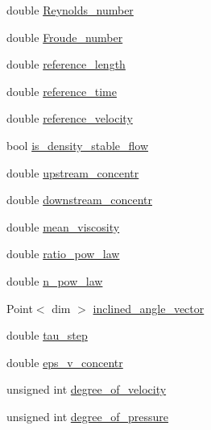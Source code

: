 \begin{DoxyCompactItemize}
\item 
double \hyperlink{struct_u_b_c__mis__mixing_1_1_parameters_aee9ec05b6197d2bb35ac20df039700ff}{Reynolds\+\_\+number}
\item 
double \hyperlink{struct_u_b_c__mis__mixing_1_1_parameters_a83dc42fae26cde2af3c525e1eedc2f2a}{Froude\+\_\+number}
\item 
double \hyperlink{struct_u_b_c__mis__mixing_1_1_parameters_a8e98aacf8865ea49090c7e1ab2e460f5}{reference\+\_\+length}
\item 
double \hyperlink{struct_u_b_c__mis__mixing_1_1_parameters_abd08d52e96063537e6f97c7d3e50e830}{reference\+\_\+time}
\item 
double \hyperlink{struct_u_b_c__mis__mixing_1_1_parameters_a77b36610cc1cd6f5a07dc362c490d14d}{reference\+\_\+velocity}
\item 
bool \hyperlink{struct_u_b_c__mis__mixing_1_1_parameters_afbdbb5e1c2b5eab71b32ba865d33222c}{is\+\_\+density\+\_\+stable\+\_\+flow}
\item 
double \hyperlink{struct_u_b_c__mis__mixing_1_1_parameters_a70038d4135c91df2f4e5bc264436c537}{upstream\+\_\+concentr}
\item 
double \hyperlink{struct_u_b_c__mis__mixing_1_1_parameters_a398a5206459752d26d9851834bb8ef43}{downstream\+\_\+concentr}
\item 
double \hyperlink{struct_u_b_c__mis__mixing_1_1_parameters_acc367af009234bfb0e3c6af0d3872ce2}{mean\+\_\+viscosity}
\item 
double \hyperlink{struct_u_b_c__mis__mixing_1_1_parameters_a3fd3d1dc26004ad858cd04ed0fa80867}{ratio\+\_\+pow\+\_\+law}
\item 
double \hyperlink{struct_u_b_c__mis__mixing_1_1_parameters_a897cb7915129443818689eba5432f95e}{n\+\_\+pow\+\_\+law}
\item 
Point$<$ dim $>$ \hyperlink{struct_u_b_c__mis__mixing_1_1_parameters_a59c99018c9fa987dc19276029440d294}{inclined\+\_\+angle\+\_\+vector}
\item 
double \hyperlink{struct_u_b_c__mis__mixing_1_1_parameters_ab2db66b6fdb65bf7933aca4264f05a61}{tau\+\_\+step}
\item 
double \hyperlink{struct_u_b_c__mis__mixing_1_1_parameters_af91b302127463e747b8a814c51889eae}{eps\+\_\+v\+\_\+concentr}
\item 
unsigned int \hyperlink{struct_u_b_c__mis__mixing_1_1_parameters_a8df2e2964a815d173d465a9cdbb1fbc9}{degree\+\_\+of\+\_\+velocity}
\item 
unsigned int \hyperlink{struct_u_b_c__mis__mixing_1_1_parameters_aa64481fdb7859afd157860e5edb733fc}{degree\+\_\+of\+\_\+pressure}

\end{DoxyCompactItemize}
